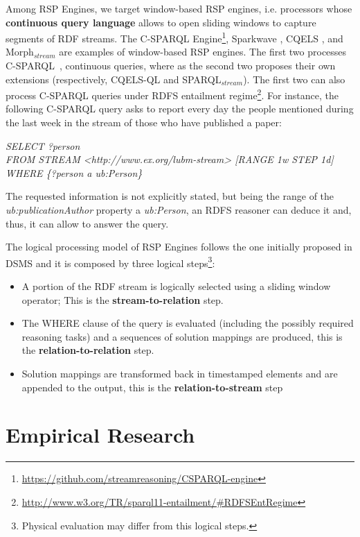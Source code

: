 Among RSP Engines, we target window-based RSP engines, i.e. processors whose \textbf{continuous query language} allows to open sliding windows to capture segments of RDF streams. The C-SPARQL Engine\footnote{\url{https://github.com/streamreasoning/CSPARQL-engine}}, Sparkwave \cite{DBLP:conf/debs/KomazecCF12}, CQELS \cite{Lephuoc2011}, and Morph$_{stream}$ \cite{DBLP:journals/ijswis/CalbimonteJCA12}  are examples of window-based RSP engines.  The first two processes C-SPARQL~\cite{Barbieri2010}, continuous queries, where as the second two proposes their own extensions (respectively, CQELS-QL and SPARQL$_{stream}$). The first two can also process C-SPARQL queries under RDFS entailment regime\footnote{\url{http://www.w3.org/TR/sparql11-entailment/#RDFSEntRegime}}. For instance, the following C-SPARQL query asks to report every day the people mentioned during the last week in the stream of those who have published a paper:

\vspace{5pt}
\noindent\textit{SELECT ?person}\\
\textit{FROM STREAM <http://www.ex.org/lubm-stream> [RANGE 1w STEP 1d]}\\
\textit{WHERE \{?person a ub:Person\}}
\vspace{5pt}

The requested information is not explicitly stated, but being the range of the \textit{ub:publicationAuthor} property a \textit{ub:Person}, an RDFS reasoner can deduce it and, thus, it can allow to answer the query.

The logical processing model of RSP Engines follows the one initially proposed in DSMS and it is composed by three logical steps\footnote{Physical evaluation may differ from this logical steps.}: 
\begin{itemize}
\item[1.] A portion of the RDF stream is logically selected using a sliding window operator; This is the \textbf{stream-to-relation} step. 
\item[2.] The WHERE clause of the query is evaluated (including the possibly required reasoning tasks) and a sequences of solution mappings are produced, this is the \textbf{relation-to-relation} step.
\item[3.] Solution mappings are transformed back in timestamped elements and are appended to the output, this is the \textbf{relation-to-stream} step 
\end{itemize}


\section{Empirical Research}\label{sec:empirical-research}

